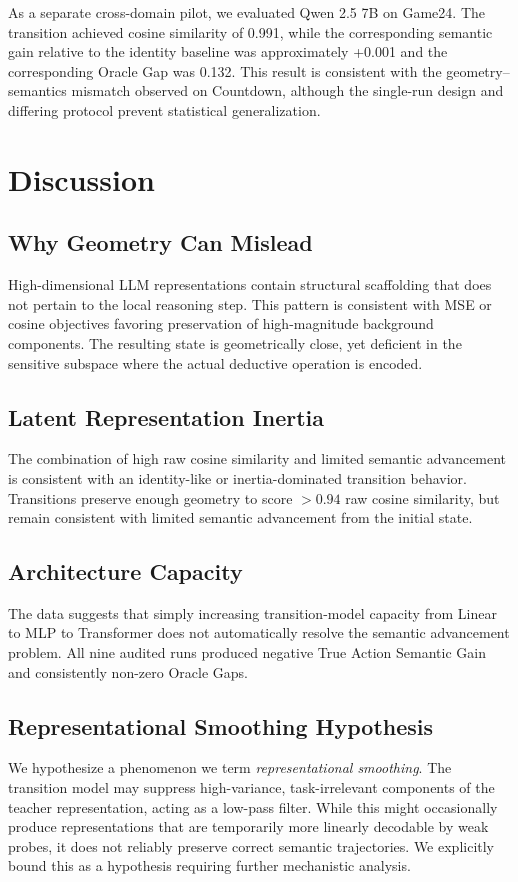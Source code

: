 \documentclass[conference]{IEEEtran}
\begin{document}
As a separate cross-domain pilot, we evaluated Qwen 2.5 7B on Game24. The transition achieved cosine similarity of 0.991, while the corresponding semantic gain relative to the identity baseline was approximately +0.001 and the corresponding Oracle Gap was 0.132. This result is consistent with the geometry--semantics mismatch observed on Countdown, although the single-run design and differing protocol prevent statistical generalization.

\section{Discussion}

\subsection{Why Geometry Can Mislead}
High-dimensional LLM representations contain structural scaffolding that does not pertain to the local reasoning step. This pattern is consistent with MSE or cosine objectives favoring preservation of high-magnitude background components. The resulting state is geometrically close, yet deficient in the sensitive subspace where the actual deductive operation is encoded.

\subsection{Latent Representation Inertia}
The combination of high raw cosine similarity and limited semantic advancement is consistent with an identity-like or inertia-dominated transition behavior. Transitions preserve enough geometry to score $>0.94$ raw cosine similarity, but remain consistent with limited semantic advancement from the initial state.

\subsection{Architecture Capacity}
The data suggests that simply increasing transition-model capacity from Linear to MLP to Transformer does not automatically resolve the semantic advancement problem. All nine audited runs produced negative True Action Semantic Gain and consistently non-zero Oracle Gaps.

\subsection{Representational Smoothing Hypothesis}
We hypothesize a phenomenon we term \textit{representational smoothing}. The transition model may suppress high-variance, task-irrelevant components of the teacher representation, acting as a low-pass filter. While this might occasionally produce representations that are temporarily more linearly decodable by weak probes, it does not reliably preserve correct semantic trajectories. We explicitly bound this as a hypothesis requiring further mechanistic analysis.
\end{document}
